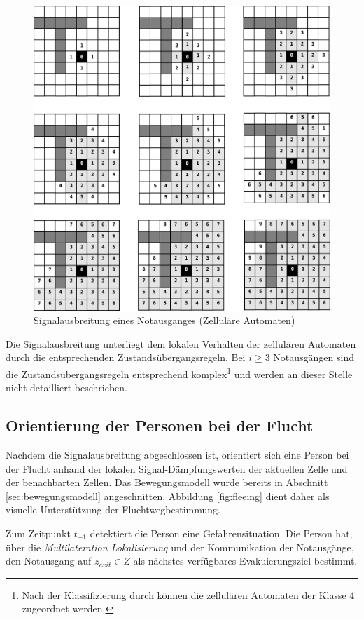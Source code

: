 \begin{figure}[!ht]
\centering
\includegraphics[height=0.9\textwidth]{algorithmik/flooding.eps}
\caption{Signalausbreitung eines Notausganges (Zelluläre Automaten)}
\label{fig:flooding}
\end{figure}

Die Signalausbreitung unterliegt dem lokalen Verhalten der zellulären Automaten durch die entsprechenden Zustandsübergangsregeln. Bei $i \geq 3$ Notausgängen sind die Zustandsübergangsregeln entsprechend komplex\footnote{Nach der Klassifizierung durch \cite{Wolfram} können die zellulären Automaten der Klasse 4 zugeordnet werden.} und werden an dieser Stelle nicht detailliert beschrieben.

\subsection{Orientierung der Personen bei der Flucht}

Nachdem die Signalausbreitung abgeschlossen ist, orientiert sich eine Person bei der Flucht anhand der lokalen Signal-Dämpfungswerten der aktuellen Zelle und der benachbarten Zellen. Das Bewegungsmodell wurde bereits in Abschnitt \ref{sec:bewegungsmodell} angeschnitten. Abbildung \ref{fig:fleeing} dient daher als visuelle Unterstützung der Fluchtwegbestimmung.

Zum Zeitpunkt $t_{-1}$ detektiert die Person eine Gefahrensituation. Die Person hat, über die \emph{Multilateration Lokalisierung} und der Kommunikation der Notausgänge, den Notausgang auf  $z_{exit} \in Z$ als nächstes verfügbares Evakuierungsziel bestimmt.

